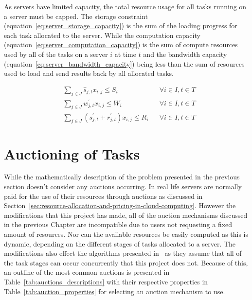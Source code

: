 As servers have limited capacity, the total resource usage for all tasks running on a server must be capped.
The storage constraint (equation~\eqref{eq:server_storage_capacity}) is the sum of the loading progress for
each task allocated to the server. While the computation capacity (equation~\eqref{eq:server_computation_capacity}) is
the sum of compute resources used by all of the tasks on a server $i$ at time $t$ and the bandwidth capacity
(equation~\eqref{eq:server_bandwidth_capacity}) being less than the sum of resources used to load and send results back
by all allocated tasks.

\begin{align}
    & \sum_{j \in J} \hat{s}_{j,t} x_{i,j} \leq S_i && \forall{i \in I, t \in T} \label{eq:server_storage_capacity} \\
    & \sum_{j \in J} w^{'}_{j,t} x_{i,j} \leq W_i && \forall{i \in I, t \in T} \label{eq:server_computation_capacity} \\
    & \sum_{j \in J} (s^{'}_{j,t} + r^{'}_{j,t}) x_{i,j} \leq R_i && \forall{i \in I, t \in T} \label{eq:server_bandwidth_capacity}
\end{align}

\section{Auctioning of Tasks}
\label{sec:auctioning-of-tasks}
While the mathematically description of the problem presented in the previous section doesn't consider any auctions
occurring. In real life servers are normally paid for the use of their resources through auctions as discussed in
Section~\ref{sec:resource-allocation-and-pricing-in-cloud-computing}. However the modifications
that this project has made, all of the auction mechanisms discussed in the previous Chapter are incompatible
due to users not requesting a fixed amount of resources. Nor can the available resources be easily computed as this is
dynamic, depending on the different stages of tasks allocated to a server. The modifications also effect the algorithms
presented in~\cite{FlexibleResourceAllocation} as they assume that all of the task stages can occur concurrently that
this project does not. Because of this, an outline of the most common auctions is presented in
Table~\ref{tab:auctions_descriptions} with their respective properties in Table~\ref{tab:auction_properties} for
selecting an auction mechanism to use.

